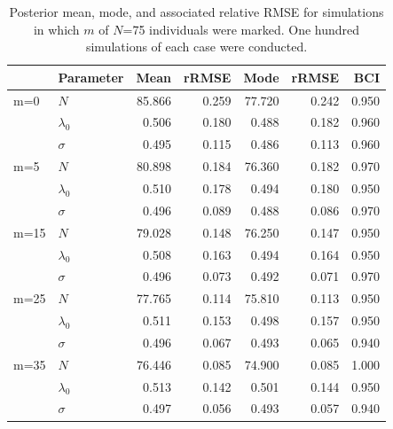 \begin{table}[ht]
\centering
\caption{Posterior mean, mode, and associated relative RMSE for simulations in
  which $m$ of $N$=75 individuals were marked. One hundred simulations of each case were conducted. }
\begin{tabular}{llrrrrr}
     \hline
     &	Parameter    &	Mean   &	rRMSE  & Mode   & rRMSE &	BCI    \\
     \hline
 m=0 &	$N$          &	85.866 &    0.259 & 77.720 &    0.242 & 0.950  \\
     &	$\lambda_0$  &	0.506  &	0.180 &	0.488  &	0.182 &	0.960  \\
     &	$\sigma$     &	0.495  &	0.115 &	0.486  &	0.113 &	0.960  \\
     \hline
 m=5 &	$N$          &	80.898 &    0.184 & 76.360 &    0.182 & 0.970  \\
     &	$\lambda_0$  &	0.510  &    0.178 & 0.494  &    0.180 & 0.950  \\
     &	$\sigma$     &	0.496  &    0.089 & 0.488  &    0.086 & 0.970  \\
     \hline
 m=15&	$N$          &	79.028 &    0.148 & 76.250 &    0.147 & 0.950  \\
     &	$\lambda_0$  &	0.508  &    0.163 & 0.494  &    0.164 & 0.950  \\
     &	$\sigma$     &	0.496  &    0.073 & 0.492  &    0.071 & 0.970  \\
     \hline
 m=25&	$N$          &	77.765 &    0.114 & 75.810 &    0.113 & 0.950  \\
     &	$\lambda_0$  &	0.511  &    0.153 & 0.498  &    0.157 & 0.950  \\
     &	$\sigma$     &	0.496  &    0.067 & 0.493  &    0.065 & 0.940  \\
     \hline
 m=35&	$N$          &	76.446 &    0.085 & 74.900 &    0.085 & 1.000  \\
     &	$\lambda_0$  &	0.513  &    0.142 & 0.501  &    0.144 & 0.950  \\
     &	$\sigma$     &	0.497  &    0.056 & 0.493  &    0.057 & 0.940  \\
 \hline
\end{tabular}
\label{partialID.tab.sim}
\end{table}

